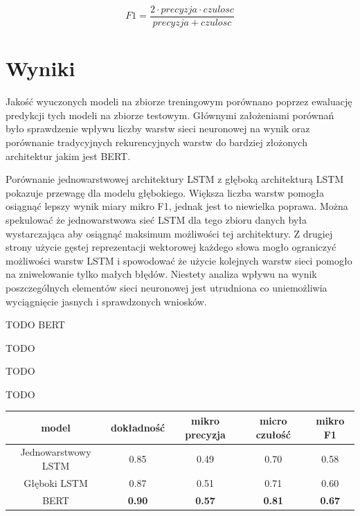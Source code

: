 \begin{equation}
\label{eqn:f1}
F1 = \frac{2 \cdot precyzja\cdot czulosc}{precyzja + czulosc}
\end{equation}

\section{Wyniki}

Jakość wyuczonych modeli na zbiorze treningowym porównano poprzez ewaluację predykcji tych modeli na zbiorze testowym. Głównymi założeniami porównań było sprawdzenie wpływu liczby warstw sieci neuronowej na wynik oraz porównanie tradycyjnych rekurencyjnych warstw do bardziej złożonych architektur jakim jest BERT. 

Porównanie jednowarstwowej architektury LSTM  z głęboką architekturą LSTM pokazuje przewagę dla modelu głębokiego. Większa liczba warstw pomogła osiągnąć lepszy wynik miary mikro F1, jednak jest to niewielka poprawa. Można spekulować że jednowarstwowa sieć LSTM dla tego zbioru danych była wystarczająca aby osiągnąć maksimum możliwości tej architektury. Z drugiej strony użycie gęstej reprezentacji wektorowej każdego słowa mogło ograniczyć możliwości warstw LSTM i spowodować że użycie kolejnych warstw sieci pomogło na zniwelowanie tylko małych błędów. Niestety analiza wpływu na wynik poszczególnych elementów sieci neuronowej jest utrudniona co uniemożliwia wyciągnięcie jasnych i sprawdzonych wniosków.

TODO BERT

TODO

TODO

TODO

\begin{table}[ht]
\label{tab:tabela_results}
\centering\footnotesize%
\begin{tabular}{c c c c c}
\toprule
model & dokładność & mikro precyzja & micro czułość & \textbf{mikro F1} \\
\midrule
Jednowarstwowy LSTM & 0.85 & 0.49 & 0.70 & 0.58 \\
Głęboki LSTM & 0.87 & 0.51 & 0.71 & 0.60 \\
BERT & \textbf{0.90} & \textbf{0.57} & \textbf{0.81} & \textbf{0.67} \\
\bottomrule
\end{tabular}
\end{table}